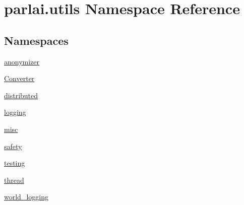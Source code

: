 \hypertarget{namespaceparlai_1_1utils}{}\section{parlai.\+utils Namespace Reference}
\label{namespaceparlai_1_1utils}
\subsection*{Namespaces}
\begin{DoxyCompactItemize}
\item 
 \hyperlink{namespaceparlai_1_1utils_1_1anonymizer}{anonymizer}
\item 
 \hyperlink{namespaceparlai_1_1utils_1_1Converter}{Converter}
\item 
 \hyperlink{namespaceparlai_1_1utils_1_1distributed}{distributed}
\item 
 \hyperlink{namespaceparlai_1_1utils_1_1logging}{logging}
\item 
 \hyperlink{namespaceparlai_1_1utils_1_1misc}{misc}
\item 
 \hyperlink{namespaceparlai_1_1utils_1_1safety}{safety}
\item 
 \hyperlink{namespaceparlai_1_1utils_1_1testing}{testing}
\item 
 \hyperlink{namespaceparlai_1_1utils_1_1thread}{thread}
\item 
 \hyperlink{namespaceparlai_1_1utils_1_1world__logging}{world\+\_\+logging}
\end{DoxyCompactItemize}
